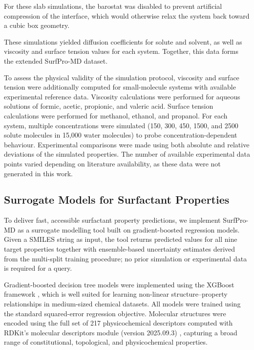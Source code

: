\documentclass[11pt]{aime}
\begin{document}
For these slab simulations, the barostat was disabled to prevent artificial compression of the interface, which would otherwise relax the system back toward a cubic box geometry.

These simulations yielded diffusion coefficients for solute and solvent, as well as viscosity and surface tension values for each system.
Together, this data forms the extended SurfPro-MD dataset.

To assess the physical validity of the simulation protocol, viscosity and surface tension were additionally computed for small-molecule systems with available experimental reference data.
Viscosity calculations were performed for aqueous solutions of formic, acetic, propionic, and valeric acid.
Surface tension calculations were performed for methanol, ethanol, and propanol.
For each system, multiple concentrations were simulated (150, 300, 450, 1500, and 2500 solute molecules in 15,000 water molecules) to probe concentration-dependent behaviour.
Experimental comparisons were made using both absolute and relative deviations of the simulated properties.
The number of available experimental data points varied depending on literature availability, as these data were not generated in this work.


\subsection{Surrogate Models for Surfactant Properties}
\label{sec:methods:surrogate}

To deliver fast, accessible surfactant property predictions, we implement SurfPro-MD as a surrogate modelling tool built on gradient-boosted regression models.
Given a SMILES string as input, the tool returns predicted values for all nine target properties together with ensemble-based uncertainty estimates derived from the multi-split training procedure;
no prior simulation or experimental data is required for a query.

Gradient-boosted decision tree models were implemented using the XGBoost framework \cite{chen_xgboost_2016,boldini_practical_2023}, which is well suited for learning non-linear structure--property relationships in medium-sized chemical datasets.
All models were trained using the standard squared-error regression objective.
Molecular structures were encoded using the full set of 217 physicochemical descriptors computed with RDKit's molecular descriptors module (version 2025.09.3) \cite{landrum2006rdkit}, capturing a broad range of constitutional, topological, and physicochemical properties.
\end{document}
